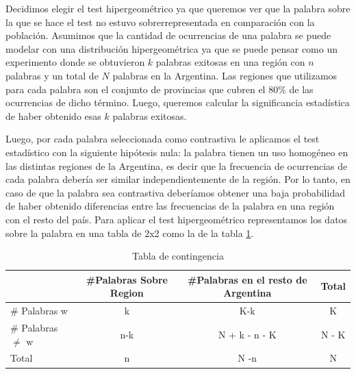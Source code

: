 Decidimos elegir el test hipergeométrico ya que queremos ver que la palabra sobre la que se hace el test no estuvo sobrerrepresentada en comparación con la población. Asumimos que la cantidad de ocurrencias de una palabra se puede modelar con una distribución hipergeométrica ya que se puede pensar como un experimento donde se obtuvieron $k$ palabras exitosas en una región con $n$ palabras y un total de $N$ palabras en la Argentina. Las regiones que utilizamos para cada palabra son el conjunto de provincias que cubren el 80\% de las ocurrencias de dicho término. Luego, queremos calcular la significancia estadística de haber obtenido esas $k$ palabras exitosas.

Luego, por cada palabra seleccionada como contrastiva le aplicamos el test estadístico con la siguiente hipótesis nula: la palabra tienen un uso homogéneo en las distintas regiones de la Argentina, es decir que la frecuencia de ocurrencias de cada palabra debería ser similar independientemente de la región.
Por lo tanto, en caso de que la palabra sea contrastiva deberíamos obtener una baja probabilidad de haber obtenido diferencias entre las frecuencias de la palabra en una región con el resto del país. 
Para aplicar el test hipergeométrico representamos los datos sobre la palabra en una tabla de 2x2 como la de la tabla \ref{tab:contingencia}.



\begin{table}[ht]
\centering
\begin{tabular}{lccc}
\hline
& \#Palabras Sobre Region &\#Palabras en el resto de Argentina &Total \\ \hline
\# Palabras w &   k & K-k & K \\ 
\# Palabras $\neq$ w & n-k & N + k - n - K  & N - K \\ 
Total & n & N -n & N \\ \hline
\end{tabular}
\caption{Tabla de contingencia}
\label{tab:contingencia}
\end{table}



